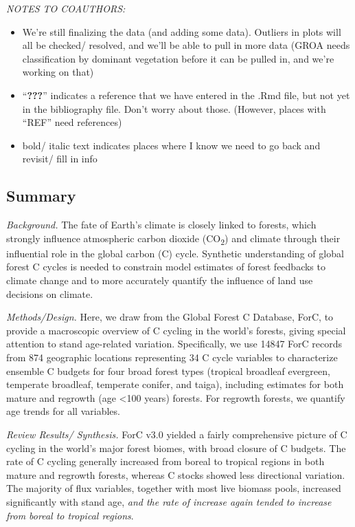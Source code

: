 \documentclass[
]{article}
\providecommand{\tightlist}{%
  \setlength{\itemsep}{0pt}\setlength{\parskip}{0pt}}
\begin{document}
\emph{NOTES TO COAUTHORS: }

\begin{itemize}
\tightlist
\item
  We're still finalizing the data (and adding some data). Outliers in
  plots will all be checked/ resolved, and we'll be able to pull in more
  data (GROA needs classification by dominant vegetation before it can
  be pulled in, and we're working on that)
\item
  ``\textbf{???}'' indicates a reference that we have entered in the
  .Rmd file, but not yet in the bibliography file. Don't worry about
  those. (However, places with ``REF'' need references)
\item
  bold/ italic text indicates places where I know we need to go back and
  revisit/ fill in info
\end{itemize}

\newpage

\hypertarget{summary}{%
\subsection{Summary}\label{summary}}

\emph{Background.} The fate of Earth's climate is closely linked to
forests, which strongly influence atmospheric carbon dioxide
(CO\textsubscript{2}) and climate through their influential role in the
global carbon (C) cycle. Synthetic understanding of global forest C
cycles is needed to constrain model estimates of forest feedbacks to
climate change and to more accurately quantify the influence of land use
decisions on climate.

\emph{Methods/Design.} Here, we draw from the Global Forest C Database,
ForC, to provide a macroscopic overview of C cycling in the world's
forests, giving special attention to stand age-related variation.
Specifically, we use 14847 ForC records from 874 geographic locations
representing 34 C cycle variables to characterize ensemble C budgets for
four broad forest types (tropical broadleaf evergreen, temperate
broadleaf, temperate conifer, and taiga), including estimates for both
mature and regrowth (age \textless100 years) forests. For regrowth
forests, we quantify age trends for all variables.

\emph{Review Results/ Synthesis.} ForC v3.0 yielded a fairly
comprehensive picture of C cycling in the world's major forest biomes,
with broad closure of C budgets. The rate of C cycling generally
increased from boreal to tropical regions in both mature and regrowth
forests, whereas C stocks showed less directional variation. The
majority of flux variables, together with most live biomass pools,
increased significantly with stand age, \emph{and the rate of increase
again tended to increase from boreal to tropical regions}.
\end{document}
